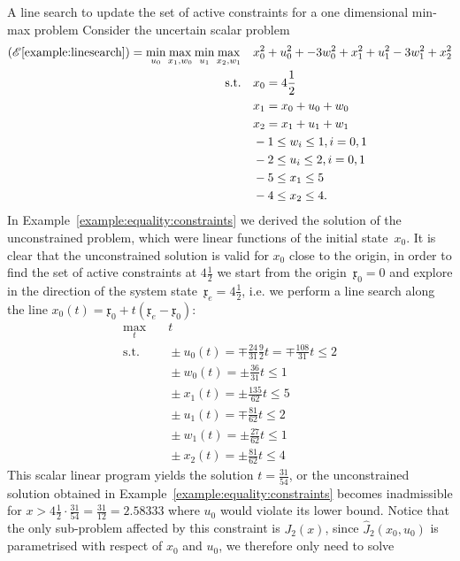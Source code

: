 \begin{example}{A line search to update the set of active constraints for a one dimensional min-max problem}\label{example:linesearch}
Consider the uncertain scalar problem
%
$$
\begin{aligned}
	(\mathscr E\ref{example:linesearch}) = \min_{u_0}\max_{x_1,w_0}\min_{u_1}\max_{x_2,w_1}& \quad x_0^2+u_0^2 +  -3w_0^2 + x_1^2+u_1^2-3w_1^2+x_2^2\\
	\text{s.t.}&\quad x_0 = 4\frac{1}{2}\\
	&\quad x_1 = x_0+u_0+w_0\\
	&\quad x_2 = x_1 + u_1+ w_1\\
	&\quad -1\leq w_i\leq 1, i = 0,1\\
	&\quad -2\leq u_i\leq 2, i = 0,1\\
	&\quad -5\leq x_1\leq 5\\
	&\quad -4\leq x_2\leq 4.
\end{aligned}
$$
%
In Example~\ref{example:equality:constraints} we derived the solution of the unconstrained problem, which were linear functions of the initial state~$x_0$.
%
It is clear that the unconstrained solution is valid for $x_0$ close to the origin, in order to find the set of active constraints at $4\frac{1}{2}$ we start from the origin~$\mathfrak{x}_0=0$ and explore in the direction of the system state~$\mathfrak{x}_e = 4\frac{1}{2}$, i.e. we perform a line search along the line $x_0(t) = \mathfrak{x}_0+t(\mathfrak{x}_e-\mathfrak{x}_0)$:
%
$$\begin{aligned}
\max_t&\quad t\\
\text{s.t.}&\quad \pm u_0(t) = \mp\frac{24}{31} \frac{9}{2}t = \mp\frac{108}{31}t \leq 2\\
&\quad \pm w_0(t) = \pm\frac{36}{31}t \leq 1\\
&\quad \pm x_1(t) = \pm \frac{135}{62}t\leq 5 \\
&\quad \pm u_1(t) = \mp \frac{81}{62}t \leq 2\\
&\quad \pm w_1(t) = \pm \frac{27}{62}t\leq 1\\
&\quad \pm x_2(t) = \pm \frac{81}{62}t\leq 4
\end{aligned}$$
%
This scalar linear program yields the solution $t = \frac{31}{54}$, or the unconstrained solution obtained in Example~\ref{example:equality:constraints} becomes inadmissible for $x>4\frac{1}{2}\cdot\frac{31}{54}=\frac{31}{12}=2.58333$ where $u_0$ would violate its lower bound.
%
Notice that the only sub-problem affected by this constraint is $J_2(x)$, since $\hat J_2(x_0,u_0)$ is parametrised with respect of $x_0$ and $u_0$, we therefore only need to solve 

\end{example}
